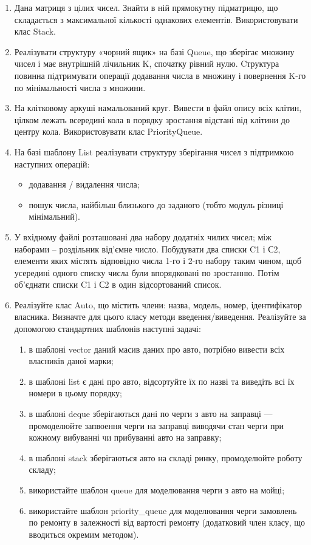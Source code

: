 \documentclass[a5paper,titlepage,openany,twoside,draft]{book_unv}%
\makeatletter
\newcommand{\xslalph}[1]{\expandafter\@xslalph\csname c@#1\endcsname}
\newcommand{\@xslalph}[1]{%
    \ifcase#1\or а\or б\or в\or г\or д\or e\or є\or ж\or з\or i%
    \or й\or к\or л\or м\or н\or о\or п\or р\or с\or т%
    \or у\or ф\or х\or ц\or ч\or ш\or ю\or я\or аа\or бб\or вв%
    \else\@ctrerr\fi%
}
\makeatother
\begin{document}
\begin{enumerate}
\def\labelenumi{\arabic{enumi})}
\setcounter{enumi}{3}

\item
  Дана матриця з цілих чисел. Знайти в ній прямокутну підматрицю, що
  складається з максимальної кількості однакових елементів.
  Використовувати клас Stack.
\item
  Реалізувати структуру «чорний ящик» на базі Queue, що зберігає множину
  чисел і має внутрішній лічильник K, спочатку рівний нулю. Cтруктура
  повинна підтримувати операції додавання числа в множину і повернення
  K-го по мінімальності числа з множини.
\item
  На клітковому аркуші намальований круг. Вивести в файл опису всіх
  клітин, цілком лежать всередині кола в порядку зростання відстані від
  клітини до центру кола. Використовувати клас PriorityQueue.
\item
  На базі шаблону List реалізувати структуру зберігання чисел з
  підтримкою наступних операцій:

  \begin{itemize}
    \item
    додавання / видалення числа;
  \item
    пошук числа, найбільш близького до заданого (тобто модуль різниці
    мінімальний).
  \end{itemize}
\item
  У вхідному файлі розташовані два набору додатніх чилих чисел; між наборами
  -- роздільник від'ємне число. Побудувати два списки C1 і С2, елементи яких
  містять відповідно числа 1-го і 2-го набору таким чином, щоб усередині
  одного списку числа були впорядковані по зростанню. Потім об'єднати
  списки C1 і С2 в один відсортований список.

\item

Реалізуйте клас Auto, що містить члени: назва, модель, номер, ідентифікатор власника.
Визначте для цього класу методи введення/виведення.
Реалізуйте за допомогою стандартних шаблонів наступні задачі:
\begin{enumerate}[label=\xslalph*)]
\item
    в шаблоні vector даний масив даних про авто, потрібно вивести всіх власників даної марки;
\item
    в шаблоні list є дані про авто, відсортуйте їх по назві та виведіть всі їх номери в цьому порядку; 
\item
    в шаблоні deque зберігаються дані по черги з авто на заправці --- промоделюйте запвоення черги
на заправці виводячи стан черги при кожному вибуванні чи прибуванні авто на заправку;
\item
    в шаблоні stack зберігаються авто на складі ринку, промоделюйте роботу складу;
\item
    використайте шаблон queue для моделювання черги з авто на мойці;
\item
    використайте шаблон priority\_queue для моделювання черги замовлень по ремонту в 
залежності від вартості ремонту (додатковий член класу, що вводиться окремим методом). 
\end{enumerate}    


\end{enumerate}
\end{document}
